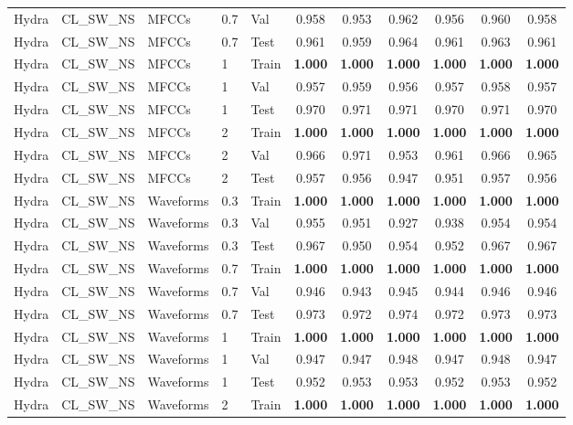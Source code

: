 \begin{landscape}
\begin{longtable}{|l|l|l|l|l|c|c|c|c|c|c|}
Hydra & CL\_SW\_NS & MFCCs & 0.7 & Val & 0.958 & 0.953 & 0.962 & 0.956 & 0.960 & 0.958 \\
Hydra & CL\_SW\_NS & MFCCs & 0.7 & Test & 0.961 & 0.959 & 0.964 & 0.961 & 0.963 & 0.961 \\
Hydra & CL\_SW\_NS & MFCCs & 1 & Train & \textbf{1.000} & \textbf{1.000} & \textbf{1.000} & \textbf{1.000} & \textbf{1.000} & \textbf{1.000} \\
Hydra & CL\_SW\_NS & MFCCs & 1 & Val & 0.957 & 0.959 & 0.956 & 0.957 & 0.958 & 0.957 \\
Hydra & CL\_SW\_NS & MFCCs & 1 & Test & 0.970 & 0.971 & 0.971 & 0.970 & 0.971 & 0.970 \\
Hydra & CL\_SW\_NS & MFCCs & 2 & Train & \textbf{1.000} & \textbf{1.000} & \textbf{1.000} & \textbf{1.000} & \textbf{1.000} & \textbf{1.000} \\
Hydra & CL\_SW\_NS & MFCCs & 2 & Val & 0.966 & 0.971 & 0.953 & 0.961 & 0.966 & 0.965 \\
Hydra & CL\_SW\_NS & MFCCs & 2 & Test & 0.957 & 0.956 & 0.947 & 0.951 & 0.957 & 0.956 \\
Hydra & CL\_SW\_NS & Waveforms & 0.3 & Train & \textbf{1.000} & \textbf{1.000} & \textbf{1.000} & \textbf{1.000} & \textbf{1.000} & \textbf{1.000} \\
Hydra & CL\_SW\_NS & Waveforms & 0.3 & Val & 0.955 & 0.951 & 0.927 & 0.938 & 0.954 & 0.954 \\
Hydra & CL\_SW\_NS & Waveforms & 0.3 & Test & 0.967 & 0.950 & 0.954 & 0.952 & 0.967 & 0.967 \\
Hydra & CL\_SW\_NS & Waveforms & 0.7 & Train & \textbf{1.000} & \textbf{1.000} & \textbf{1.000} & \textbf{1.000} & \textbf{1.000} & \textbf{1.000} \\
Hydra & CL\_SW\_NS & Waveforms & 0.7 & Val & 0.946 & 0.943 & 0.945 & 0.944 & 0.946 & 0.946 \\
Hydra & CL\_SW\_NS & Waveforms & 0.7 & Test & 0.973 & 0.972 & 0.974 & 0.972 & 0.973 & 0.973 \\
Hydra & CL\_SW\_NS & Waveforms & 1 & Train & \textbf{1.000} & \textbf{1.000} & \textbf{1.000} & \textbf{1.000} & \textbf{1.000} & \textbf{1.000} \\
Hydra & CL\_SW\_NS & Waveforms & 1 & Val & 0.947 & 0.947 & 0.948 & 0.947 & 0.948 & 0.947 \\
Hydra & CL\_SW\_NS & Waveforms & 1 & Test & 0.952 & 0.953 & 0.953 & 0.952 & 0.953 & 0.952 \\
Hydra & CL\_SW\_NS & Waveforms & 2 & Train & \textbf{1.000} & \textbf{1.000} & \textbf{1.000} & \textbf{1.000} & \textbf{1.000} & \textbf{1.000} \\

\end{longtable}
\end{landscape}
